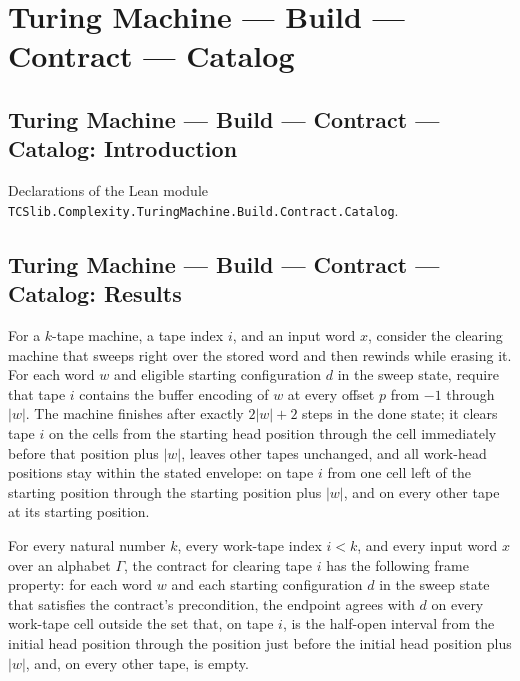 \section{Turing Machine --- Build --- Contract --- Catalog}
\subsection*{Turing Machine --- Build --- Contract --- Catalog: Introduction}

Declarations of the Lean module \texttt{TCSlib.Complexity.TuringMachine.Build.Contract.Catalog}.

\subsection*{Turing Machine --- Build --- Contract --- Catalog: Results}

\begin{definition}
\label{Turing.clearTM_contract}
\leanok
{}
For a $k$-tape machine, a tape index $i$, and an input word $x$, consider the clearing
machine that sweeps right over the stored word and then rewinds while erasing it. For
each word $w$ and eligible starting configuration $d$ in the sweep state, require that
tape $i$ contains the buffer encoding of $w$ at every offset $p$ from $-1$ through
$|w|$. The machine finishes after exactly $2|w|+2$ steps in the done state; it clears
tape $i$ on the cells from the starting head position through the cell immediately
before that position plus $|w|$, leaves other tapes unchanged, and all work-head
positions stay within the stated envelope: on tape $i$ from one cell left of the
starting position through the starting position plus $|w|$, and on every other tape at
its starting position.
\end{definition}

\begin{theorem}
\label{Turing.clearTM_contract_frames}
\leanok
{}
For every natural number $k$, every work-tape index $i<k$, and every input word $x$ over
an alphabet $\Gamma$, the contract for clearing tape $i$ has the following frame
property: for each word $w$ and each starting configuration $d$ in the sweep state that
satisfies the contract's precondition, the endpoint agrees with $d$ on every work-tape
cell outside the set that, on tape $i$, is the half-open interval from the initial head
position through the position just before the initial head position plus $|w|$, and, on
every other tape, is empty.
\end{theorem}

